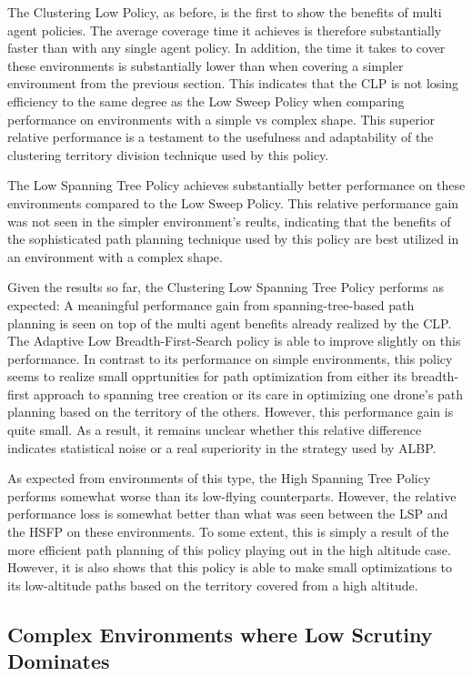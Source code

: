 The Clustering Low Policy, as before, is the first to show the benefits of multi agent policies. The average coverage time it achieves is therefore substantially faster than with any single agent policy. In addition, the time it takes to cover these environments is substantially lower than when covering a simpler environment from the previous section. This indicates that the CLP is not losing efficiency to the same degree as the Low Sweep Policy when comparing performance on environments with a simple vs complex shape. This superior relative performance is a testament to the usefulness and adaptability of the clustering territory division technique used by this policy.

The Low Spanning Tree Policy achieves substantially better performance on these environments compared to the Low Sweep Policy. This relative performance gain was not seen in the simpler environment's reults, indicating that the benefits of the sophisticated path planning technique used by this policy are best utilized in an environment with a complex shape.

Given the results so far, the Clustering Low Spanning Tree Policy performs as expected: A meaningful performance gain from spanning-tree-based path planning is seen on top of the multi agent benefits already realized by the CLP. The Adaptive Low Breadth-First-Search policy is able to improve slightly on this performance. In contrast to its performance on simple environments, this policy seems to realize small opprtunities for path optimization from either its breadth-first approach to spanning tree creation or its care in optimizing one drone's path planning based on the territory of the others. However, this performance gain is quite small. As a result, it remains unclear whether this relative difference indicates statistical noise or a real superiority in the strategy used by ALBP.

As expected from environments of this type, the High Spanning Tree Policy performs somewhat worse than its low-flying counterparts. However, the relative performance loss is somewhat better than what was seen between the LSP and the HSFP on these environments. To some extent, this is simply a result of the more efficient path planning of this policy playing out in the high altitude case. However, it is also shows that this policy is able to make small optimizations to its low-altitude paths based on the territory covered from a high altitude.

\subsection{Complex Environments where Low Scrutiny Dominates}

